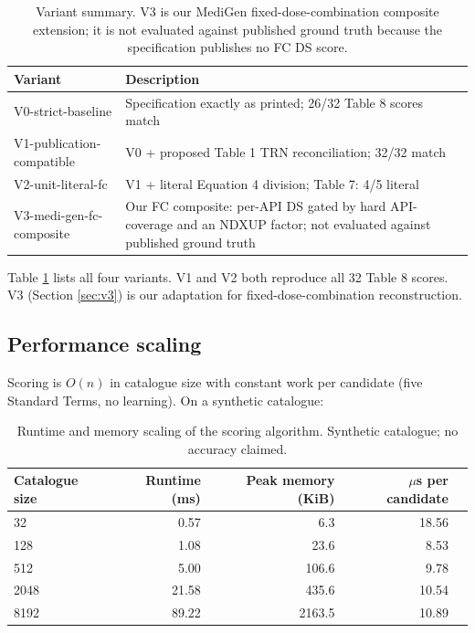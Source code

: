 \documentclass[twocolumn,a4paper]{elsarticle}
\begin{document}
\begin{table}[htbp]
\centering\small
\caption{Variant summary. V3 is our MediGen fixed-dose-combination composite extension; it is not evaluated against published ground truth because the specification publishes no FC DS score.}
\label{tab:variants}
\begin{tabular}{@{}lp{10cm}@{}}
\toprule
Variant & Description \\
\midrule
V0-strict-baseline & Specification exactly as printed; 26/32 Table 8 scores match \\
V1-publication-compatible & V0 + proposed Table 1 TRN reconciliation; 32/32 match \\
V2-unit-literal-fc & V1 + literal Equation 4 division; Table 7: 4/5 literal \\
V3-medi-gen-fc-composite & Our FC composite: per-API DS gated by hard API-coverage and an NDXUP factor; not evaluated against published ground truth \\
\bottomrule
\end{tabular}
\end{table}

Table \ref{tab:variants} lists all four variants. V1 and V2 both reproduce all 32 Table 8 scores. V3 (Section \ref{sec:v3}) is our adaptation for fixed-dose-combination reconstruction.

\subsection{Performance scaling}
\label{sec:results-scaling}

Scoring is $O(n)$ in catalogue size with constant work per candidate (five Standard Terms, no learning). On a synthetic catalogue:

\begin{table}[htbp]
\centering\small
\caption{Runtime and memory scaling of the scoring algorithm. Synthetic catalogue; no accuracy claimed.}
\label{tab:scaling}
\begin{tabular}{@{}lrrrr@{}}
\toprule
Catalogue size & Runtime (ms) & Peak memory (KiB) & $\mu$s per candidate \\
\midrule
32 & 0.57 & 6.3 & 18.56 \\
128 & 1.08 & 23.6 & 8.53 \\
512 & 5.00 & 106.6 & 9.78 \\
2048 & 21.58 & 435.6 & 10.54 \\
8192 & 89.22 & 2163.5 & 10.89 \\
\bottomrule
\end{tabular}
\end{table}
\end{document}
